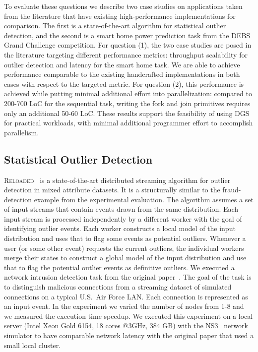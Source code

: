 To evaluate these questions we describe two case studies on applications taken from the literature that have existing high-performance implementations for comparison. The first is a state-of-the-art algorithm for statistical outlier detection, and the second is a smart home power prediction task from the DEBS Grand Challenge competition.
For question (1),
the two case studies are posed in the literature targeting different performance metrics: throughput scalability for outlier detection and latency for the smart home task.
We are able to achieve performance comparable to the existing handcrafted implementations in both cases with respect to the targeted metric.
For question (2), this performance is achieved while putting minimal additional effort into parallelization: compared to 200-700 LoC for the sequential task, writing the fork and join primitives requires only an additional 50-60 LoC.
These results support the feasibility of using DGS for practical workloads, with minimal additional programmer effort to accomplish parallelism.

\subsection{Statistical Outlier Detection}
\label{dgs:ssec:outlier-detection}

\textsc{Reloaded}~\cite{otey2006fast} is a state-of-the-art distributed
streaming algorithm for outlier detection in mixed attribute
datasets. It is a structurally similar
to the fraud-detection example from the experimental evaluation.
The algorithm assumes a set of input streams that
contain events drawn from the same distribution. Each input stream is
processed independently by a different worker with the goal of
identifying outlier events. Each worker constructs a local model of
the input distribution and uses that to flag some events as potential
outliers. Whenever a user (or some other event) requests the current
outliers, the individual workers merge their states to construct a
global model of the input distribution and use that to flag the
potential outlier events as definitive outliers.
We executed a network
intrusion detection task from the original
paper~\cite{kddcup1999dataset}.
The goal of the task is to distinguish malicious connections from a
streaming dataset of simulated connections on a typical U.S.~Air Force
LAN. Each connection is represented as an input event. In the
experiment we varied the number of nodes from 1-8 and we measured the
execution time speedup. We executed this experiment on a local server
(Intel Xeon Gold 6154, 18 cores @3GHz, 384 GB) with the NS3~\cite{carneiro2010ns3} network simulator
to have comparable network latency with the original paper that used a small local cluster.

